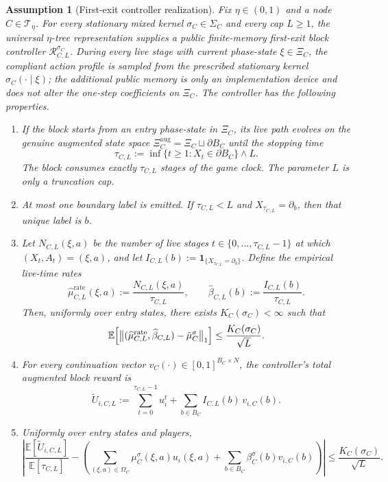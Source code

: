 \documentclass[12pt]{article}
\newtheorem{assumption}[theorem]{Assumption}
\theoremstyle{definition}
\newcommand{\E}{\mathbb{E}}
\newcommand{\1}{\mathbf{1}}
\newcommand{\cT}{\mathcal{T}}
\begin{document}
\begin{assumption}[First-exit controller realization]
\label{ass:controller-input}
Fix $\eta\in(0,1)$ and a node $C\in\cT_\eta$. For every stationary mixed kernel
$\sigma_C\in\Sigma_C$ and every cap $L\ge 1$, the universal
$\eta$-tree representation supplies a public finite-memory first-exit block
controller $\mathcal R_{C,L}^{\sigma_C}$. During every live stage with current
phase-state $\xi\in\Xi_C$, the compliant action profile is sampled from the
prescribed stationary kernel $\sigma_C(\cdot\mid\xi)$; the additional public
memory is only an implementation device and does not alter the one-step
coefficients on $\Xi_C$. The controller has the following properties.
\begin{enumerate}[label=\textnormal{(R\arabic*)},leftmargin=2.8em]
\item If the block starts from an entry phase-state in $\Xi_C$, its live path
evolves on the genuine augmented state space
$\Xi_C^{\mathrm{aug}}=\Xi_C\sqcup\partial B_C$ until the stopping time
\[
\tau_{C,L}
:=
\inf\{t\ge 1:X_t\in\partial B_C\}\wedge L.
\]
The block consumes exactly $\tau_{C,L}$ stages of the game clock. The parameter
$L$ is only a truncation cap.
\item At most one boundary label is emitted. If $\tau_{C,L}<L$ and
$X_{\tau_{C,L}}=\partial_b$, then that unique label is $b$.
\item Let $N_{C,L}(\xi,a)$ be the number of live stages
$t\in\{0,\dots,\tau_{C,L}-1\}$ at which $(X_t,A_t)=(\xi,a)$, and let
$I_{C,L}(b):=\1_{\{X_{\tau_{C,L}}=\partial_b\}}$. Define the empirical live-time
rates
\[
\widehat\mu_{C,L}^{\mathrm{rate}}(\xi,a):=\frac{N_{C,L}(\xi,a)}{\tau_{C,L}},
\qquad
\widehat\beta_{C,L}(b):=\frac{I_{C,L}(b)}{\tau_{C,L}}.
\]
Then, uniformly over entry states, there exists $K_C(\sigma_C)<\infty$ such that
\begin{equation}
\label{eq:controller-input-occ}
\E\Bigl[
\bigl\|(\widehat\mu_{C,L}^{\mathrm{rate}},\widehat\beta_{C,L})
-
\bar\mu_C^\sigma
\bigr\|_1
\Bigr]
\le \frac{K_C(\sigma_C)}{\sqrt L}.
\end{equation}
\item For every continuation vector $v_C(\cdot)\in[0,1]^{B_C\times N}$, the
controller's total augmented block reward is
\[
\widetilde U_{i,C,L}
:=
\sum_{t=0}^{\tau_{C,L}-1} u_i^t
+
\sum_{b\in B_C}I_{C,L}(b)\,v_{i,C}(b).
\]
\item Uniformly over entry states and players,
\begin{equation}
\label{eq:controller-input-renewal}
\left|
\frac{\E[\widetilde U_{i,C,L}]}{\E[\tau_{C,L}]}
-
\left(
\sum_{(\xi,a)\in\Omega_C}\mu_C^\sigma(\xi,a)u_i(\xi,a)
+
\sum_{b\in B_C}\beta_C^\sigma(b)v_{i,C}(b)
\right)
\right|
\le \frac{K_C(\sigma_C)}{\sqrt L}.
\end{equation}
\end{enumerate}
\end{assumption}
\end{document}
